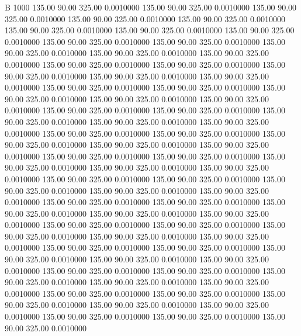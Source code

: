 


B 1000
 135.00   90.00  325.00   0.0010000
 135.00   90.00  325.00   0.0010000
 135.00   90.00  325.00   0.0010000
 135.00   90.00  325.00   0.0010000
 135.00   90.00  325.00   0.0010000
 135.00   90.00  325.00   0.0010000
 135.00   90.00  325.00   0.0010000
 135.00   90.00  325.00   0.0010000
 135.00   90.00  325.00   0.0010000
 135.00   90.00  325.00   0.0010000
 135.00   90.00  325.00   0.0010000
 135.00   90.00  325.00   0.0010000
 135.00   90.00  325.00   0.0010000
 135.00   90.00  325.00   0.0010000
 135.00   90.00  325.00   0.0010000
 135.00   90.00  325.00   0.0010000
 135.00   90.00  325.00   0.0010000
 135.00   90.00  325.00   0.0010000
 135.00   90.00  325.00   0.0010000
 135.00   90.00  325.00   0.0010000
 135.00   90.00  325.00   0.0010000
 135.00   90.00  325.00   0.0010000
 135.00   90.00  325.00   0.0010000
 135.00   90.00  325.00   0.0010000
 135.00   90.00  325.00   0.0010000
 135.00   90.00  325.00   0.0010000
 135.00   90.00  325.00   0.0010000
 135.00   90.00  325.00   0.0010000
 135.00   90.00  325.00   0.0010000
 135.00   90.00  325.00   0.0010000
 135.00   90.00  325.00   0.0010000
 135.00   90.00  325.00   0.0010000
 135.00   90.00  325.00   0.0010000
 135.00   90.00  325.00   0.0010000
 135.00   90.00  325.00   0.0010000
 135.00   90.00  325.00   0.0010000
 135.00   90.00  325.00   0.0010000
 135.00   90.00  325.00   0.0010000
 135.00   90.00  325.00   0.0010000
 135.00   90.00  325.00   0.0010000
 135.00   90.00  325.00   0.0010000
 135.00   90.00  325.00   0.0010000
 135.00   90.00  325.00   0.0010000
 135.00   90.00  325.00   0.0010000
 135.00   90.00  325.00   0.0010000
 135.00   90.00  325.00   0.0010000
 135.00   90.00  325.00   0.0010000
 135.00   90.00  325.00   0.0010000
 135.00   90.00  325.00   0.0010000
 135.00   90.00  325.00   0.0010000
 135.00   90.00  325.00   0.0010000
 135.00   90.00  325.00   0.0010000
 135.00   90.00  325.00   0.0010000
 135.00   90.00  325.00   0.0010000
 135.00   90.00  325.00   0.0010000
 135.00   90.00  325.00   0.0010000
 135.00   90.00  325.00   0.0010000
 135.00   90.00  325.00   0.0010000
 135.00   90.00  325.00   0.0010000
 135.00   90.00  325.00   0.0010000
 135.00   90.00  325.00   0.0010000
 135.00   90.00  325.00   0.0010000
 135.00   90.00  325.00   0.0010000
 135.00   90.00  325.00   0.0010000
 135.00   90.00  325.00   0.0010000
 135.00   90.00  325.00   0.0010000
 135.00   90.00  325.00   0.0010000
 135.00   90.00  325.00   0.0010000
 135.00   90.00  325.00   0.0010000
 135.00   90.00  325.00   0.0010000
 135.00   90.00  325.00   0.0010000
